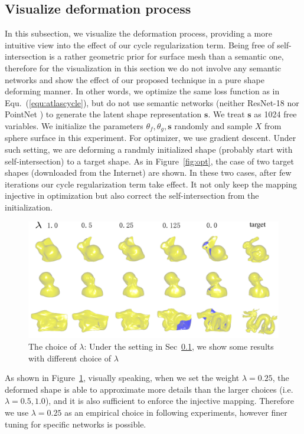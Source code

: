 \subsection{Visualize deformation process}
\label{subsec:deform}
In this subsection, we visualize the deformation process, providing a more intuitive view into the effect of our cycle regularization term. Being free of self-intersection is a rather geometric prior for surface mesh than a semantic one, therefore for the visualization in this section we do not involve any semantic networks and show the effect of our proposed technique in a pure shape deforming manner. In other words, we optimize the same loss function as in Equ.~(\ref{equ:atlascycle}), but do not use semantic networks (neither ResNet-18 \cite{resnet} nor PointNet \cite{pointnet}) to generate the latent shape representation $\mathbf{s}$. We treat $\mathbf{s}$ as 1024 free variables. We initialize the parameters $\theta_f,\theta_g,\mathbf{s}$ randomly and sample $X$ from sphere surface in this experiment. For optimizer, we use gradient descent. Under such setting, we are deforming a randmly initialized shape (probably start with self-intersection) to a target shape. As in Figure~\ref{fig:opt}, the case of two target shapes (downloaded from the Internet) are shown. In these two cases, after few iterations our cycle regularization term take effect. It not only keep the mapping injective in optimization but also correct the self-intersection from the initialization.

\begin{figure}[htbp]
	\centering
	\includegraphics[width=\linewidth]{img/opt/lambda}
	\caption{The choice of $\lambda$: Under the setting in Sec~\ref{subsec:deform}, we show some results with different choice of $\lambda$}
	\label{fig:lambda}
\end{figure}

As shown in Figure~\ref{fig:lambda}, visually speaking, when we set the weight $\lambda=0.25$, the deformed shape is able to approximate more details than the larger choices (i.e. $\lambda=0.5,1.0$), and it is also sufficient to enforce the injective mapping.  Therefore we use $\lambda=0.25$ as an empirical choice in following experiments, however finer tuning for specific networks is possible. 
